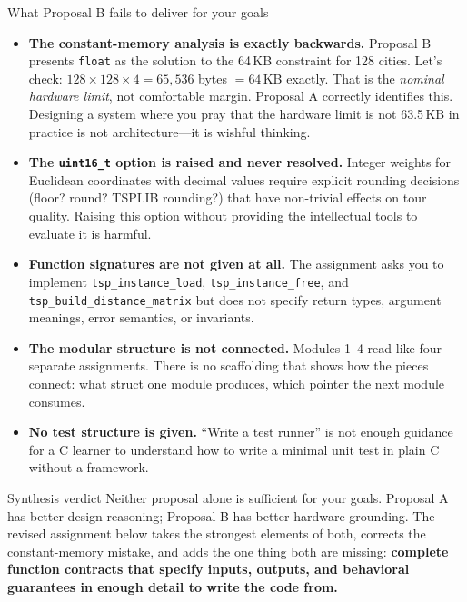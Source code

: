 \documentclass[11pt]{article}
\begin{document}
\begin{critique}{What Proposal B fails to deliver for your goals}
\begin{itemize}
  \item \textbf{The constant-memory analysis is exactly backwards.} Proposal B presents \texttt{float} as the solution to the 64\,KB constraint for 128 cities. Let's check: $128 \times 128 \times 4 = 65{,}536$ bytes $= 64$\,KB exactly. That is the \emph{nominal hardware limit}, not comfortable margin. Proposal A correctly identifies this. Designing a system where you pray that the hardware limit is not 63.5\,KB in practice is not architecture---it is wishful thinking.
  \item \textbf{The \texttt{uint16\_t} option is raised and never resolved.} Integer weights for Euclidean coordinates with decimal values require explicit rounding decisions (floor? round? TSPLIB rounding?) that have non-trivial effects on tour quality. Raising this option without providing the intellectual tools to evaluate it is harmful.
  \item \textbf{Function signatures are not given at all.} The assignment asks you to implement \texttt{tsp\_instance\_load}, \texttt{tsp\_instance\_free}, and \texttt{tsp\_build\_distance\_matrix} but does not specify return types, argument meanings, error semantics, or invariants.
  \item \textbf{The modular structure is not connected.} Modules 1--4 read like four separate assignments. There is no scaffolding that shows how the pieces connect: what struct one module produces, which pointer the next module consumes.
  \item \textbf{No test structure is given.} ``Write a test runner'' is not enough guidance for a C learner to understand how to write a minimal unit test in plain C without a framework.
\end{itemize}
\end{critique}

\begin{inquiry}{Synthesis verdict}
Neither proposal alone is sufficient for your goals. Proposal A has better design reasoning; Proposal B has better hardware grounding. The revised assignment below takes the strongest elements of both, corrects the constant-memory mistake, and adds the one thing both are missing: \textbf{complete function contracts that specify inputs, outputs, and behavioral guarantees in enough detail to write the code from.}
\end{inquiry}
\end{document}
